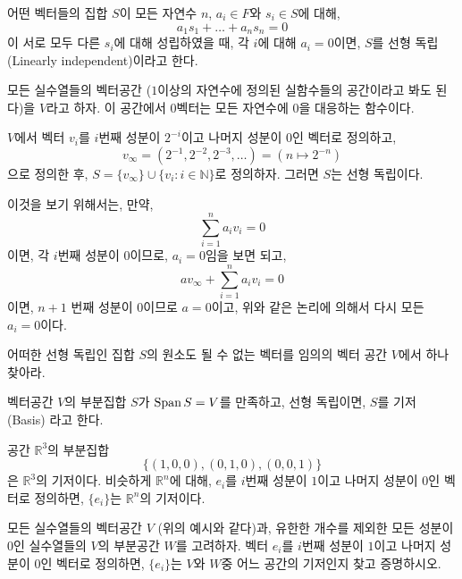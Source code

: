 \begin{definition}
    어떤 벡터들의 집합 $S$이 모든 자연수 $n$, $a_i \in F$와 $s_i \in S$에 대해,
    \begin{equation*}
        a_1 s_1 + \dots + a_n s_n = 0
    \end{equation*}
    이 서로 모두 다른 $s_i$에 대해 성립하였을 때, 각 $i$에 대해 $a_i = 0$이면, $S$를 선형 독립(Linearly independent)이라고 한다.  
\end{definition}
\begin{example}
    모든 실수열들의 벡터공간 ($1$이상의 자연수에 정의된 실함수들의 공간이라고 봐도 된다)을 $V$라고 하자.
    이 공간에서 $0$벡터는 모든 자연수에 $0$을 대응하는 함수이다.
    
    $V$에서 벡터 $v_i$를 $i$번째 성분이 $2^{-i}$이고 나머지 성분이 $0$인 벡터로 정의하고,
    \begin{equation*}
        v_{\infty} = (2^{-1}, 2^{-2}, 2^{-3}, \dots ) = (n \mapsto 2^{-n})
    \end{equation*}
    으로 정의한 후, $S = \{v_\infty\} \cup \{v_i : i\in \mathbb{N}\}$로 정의하자.
    그러면 $S$는 선형 독립이다.

    이것을 보기 위해서는, 만약,
    \begin{equation*}
        \sum_{i = 1}^n a_i v_i = 0 
    \end{equation*}
    이면, 각 $i$번째 성분이 $0$이므로, $a_i = 0$임을 보면 되고,
    \begin{equation*}
        a v_\infty + \sum_{i = 1}^n a_i v_i = 0
    \end{equation*}
    이면, $n + 1$ 번째 성분이 $0$이므로 $a = 0$이고, 위와 같은 논리에 의해서 다시 모든 $a_i = 0$이다.
\end{example}
\begin{exercise}
    어떠한 선형 독립인 집합 $S$의 원소도 될 수 없는 벡터를 임의의 벡터 공간 $V$에서 하나 찾아라.
\end{exercise}

\begin{definition}
    벡터공간 $V$의 부분집합 $S$가 $\operatorname{Span} S = V$를 만족하고, 선형 독립이면, $S$를 기저 (Basis) 라고 한다.  
\end{definition}
\begin{example}
    공간 $\mathbb{R}^3$의 부분집합
    \begin{equation*}
        \{(1, 0, 0), (0, 1, 0), (0, 0, 1)\}
    \end{equation*}
    은 $\mathbb{R}^3$의 기저이다.
    비슷하게 $\mathbb{R}^n$에 대해, $e_i$를 $i$번째 성분이 $1$이고 나머지 성분이 $0$인 벡터로 정의하면, $\{e_i\}$는 $\mathbb{R}^n$의 기저이다.
\end{example}
\begin{exercise}
    모든 실수열들의 벡터공간 $V$ (위의 예시와 같다)과, 유한한 개수를 제외한 모든 성분이 $0$인 실수열들의 $V$의 부분공간 $W$를 고려하자.
    벡터 $e_i$를 $i$번째 성분이 $1$이고 나머지 성분이 $0$인 벡터로 정의하면, $\{e_i\}$는 $V$와 $W$중 어느 공간의 기저인지 찾고 증명하시오.
\end{exercise}

